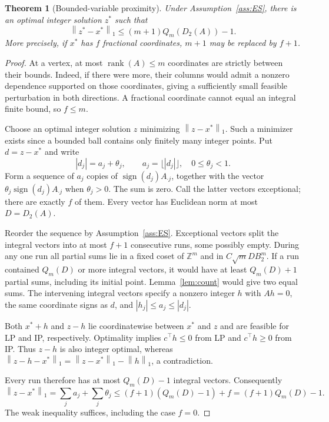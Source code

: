 \documentclass[11pt]{article}
\newtheorem{theorem}{Theorem}[section]
\theoremstyle{definition}
\theoremstyle{remark}
\newcommand{\Z}{\mathbb Z}
\newcommand{\norm}[1]{\left\lVert #1\right\rVert}
\DeclareMathOperator{\rank}{rank}
\DeclareMathOperator{\sign}{sign}
\begin{document}
\begin{theorem}[Bounded-variable proximity]\label{thm:proximity}
Under Assumption~\ref{ass:ES}, there is an optimal integer solution $z^*$
such that
\[
 \norm{z^*-x^*}_1\le(m+1)Q_m(D_2(A))-1.
 \tag{5}\label{eq:prox}
\]
More precisely, if $x^*$ has $f$ fractional coordinates, $m+1$ may be
replaced by $f+1$.
\end{theorem}
\begin{proof}
At a vertex, at most $\rank(A)\le m$ coordinates are strictly between
their bounds. Indeed, if there were more, their columns would admit a
nonzero dependence supported on those coordinates, giving a sufficiently
small feasible perturbation in both directions. A fractional coordinate
cannot equal an integral finite bound, so $f\le m$.

Choose an optimal integer solution $z$ minimizing $\norm{z-x^*}_1$.
Such a minimizer exists since a bounded ball contains only finitely many
integer points. Put $d=z-x^*$ and write
\[
 |d_j|=a_j+\theta_j,\qquad a_j=\lfloor|d_j|\rfloor,\quad 0\le\theta_j<1.
\]
Form a sequence of $a_j$ copies of $\sign(d_j)A_{\cdot j}$, together
with the vector $\theta_j\sign(d_j)A_{\cdot j}$ when $\theta_j>0$.
The sum is zero. Call the latter vectors exceptional; there are exactly
$f$ of them. Every vector has Euclidean norm at most $D=D_2(A)$.

Reorder the sequence by Assumption~\ref{ass:ES}. Exceptional vectors
split the integral vectors into at most $f+1$ consecutive runs, some
possibly empty. During any one run all partial sums lie in a fixed coset
of $\Z^m$ and in $C\sqrt m D B_2^m$. If a run contained $Q_m(D)$ or more
integral vectors, it would have at least $Q_m(D)+1$ partial sums,
including its initial point. Lemma~\ref{lem:count} would give two equal
sums. The intervening integral vectors specify a nonzero integer $h$
with $Ah=0$, the same coordinate signs as $d$, and $|h_j|\le a_j\le|d_j|$.

Both $x^*+h$ and $z-h$ lie coordinatewise between $x^*$ and $z$ and
are feasible for LP and IP, respectively. Optimality implies
$c^\top h\le0$ from LP and $c^\top h\ge0$ from IP. Thus $z-h$ is also
integer optimal, whereas
$\norm{z-h-x^*}_1=\norm{z-x^*}_1-\norm h_1$, a contradiction.

Every run therefore has at most $Q_m(D)-1$ integral vectors. Consequently
\[
 \norm{z-x^*}_1
 =\sum_j a_j+\sum_j\theta_j
 \le(f+1)(Q_m(D)-1)+f=(f+1)Q_m(D)-1.
\]
The weak inequality suffices, including the case $f=0$.
\end{proof}
\end{document}
